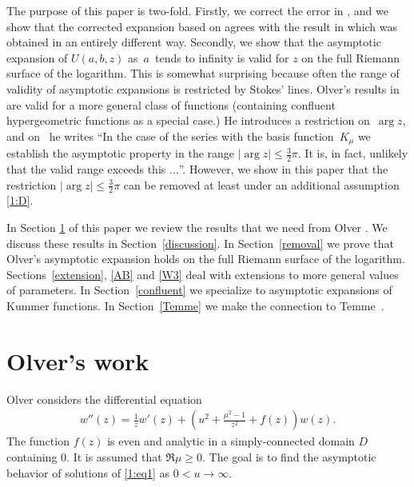 \documentclass[pdftex]{sigma}
\numberwithin{equation}{section}
\begin{document}
The purpose of this paper is two-fold. Firstly, we correct the error in \cite{S}, and we show that the corrected expansion based on \cite{O} agrees with the result in \cite{T} which was obtained in an entirely dif\/ferent way.
Secondly, we show that the asymptotic expansion of $U(a,b,z)$ as~$a$~tends to inf\/inity is valid for $z$ on the full Riemann surface of the logarithm.
This is somewhat surprising because often the range of validity of asymptotic expansions is restricted by Stokes' lines. Olver's
results in~\cite{O} are valid for a more general class of functions (containing conf\/luent hypergeometric functions as a special case.)
He introduces a restriction on~$\arg z$, and on~\mbox{\cite[p.~76]{O}} he writes ``In the case of the series with the basis function~$K_\mu$ we establish the asymptotic property in the range $|\arg z|\le \frac32 \pi$. It is, in fact, unlikely that the valid range exceeds this $\dots$''.
However, we show in this paper that the restriction $|\arg z|\le \frac32 \pi$ can be removed at least under an additional assumption \eqref{1:D}.

In Section \ref{Olver} of this paper we review the results that we need from Olver \cite{O}. We discuss these results in Section~\ref{discussion}. In Section~\ref{removal} we prove that
Olver's asymptotic expansion holds on the full Riemann surface of the logarithm. Sections~\ref{extension}, \ref{AB} and \ref{W3} deal with extensions
to more general values of parameters. In Section~\ref{confluent} we specialize to asymptotic expansions of Kummer functions. In Section~\ref{Temme}
we make the connection to Temme~\cite{T}.

\section{Olver's work}\label{Olver}
Olver \cite[(7.3)]{O} considers the dif\/ferential equation
\begin{gather}\label{1:eq1}
w''(z)=\frac1z w'(z)+\left(u^2+\frac{\mu^2-1}{z^2}+f(z)\right)w(z) .
\end{gather}
The function $f(z)$ is even and analytic in a simply-connected domain $D$ containing $0$.
It is assumed that $\Re\mu\ge 0$.
The goal is to f\/ind the asymptotic
behavior of solutions of \eqref{1:eq1} as $0<u\to\infty$.
\end{document}
